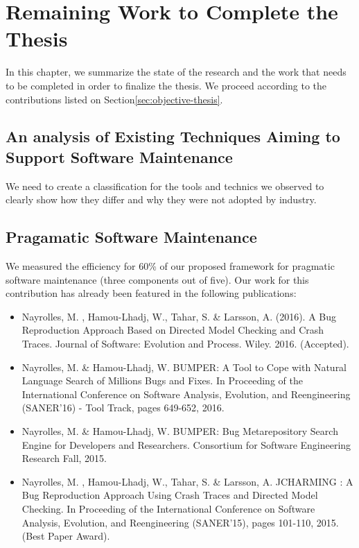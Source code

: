 
\chapter{Remaining Work to Complete the Thesis\label{chap:plan}}

In this chapter, we summarize the state of the research and the work that needs to be completed in order to finalize the thesis.
We proceed according to the contributions listed on Section\ref{sec:objective-thesis}.


\section{An analysis of Existing Techniques Aiming to Support Software Maintenance}

We need to create a classification for the tools and technics we observed to clearly show how they differ and why they were not adopted by industry.

\section{Pragamatic Software Maintenance}

We measured the efficiency for 60\% of our proposed framework for pragmatic software maintenance (three components out of five).
Our work for this contribution has already been featured in the following publications:

\begin{itemize}
	\item Nayrolles, M. , Hamou-Lhadj, W., Tahar, S. & Larsson, A. (2016). A Bug Reproduction Approach Based on Directed Model Checking and Crash Traces. Journal of Software: Evolution and Process. Wiley. 2016. (Accepted).
	\item Nayrolles, M. \& Hamou-Lhadj, W. BUMPER: A Tool to Cope with Natural Language Search of Millions Bugs and Fixes. In Proceeding of the International Conference on Software Analysis, Evolution, and Reengineering (SANER'16) - Tool Track, pages 649-652, 2016.
	\item Nayrolles, M. \& Hamou-Lhadj, W. BUMPER: Bug Metarepository Search Engine for Developers and Researchers. Consortium for Software Engineering Research Fall, 2015.
	\item Nayrolles, M. , Hamou-Lhadj, W., Tahar, S. & Larsson, A. JCHARMING : A Bug Reproduction Approach Using Crash Traces and Directed Model Checking. In Proceeding of the International Conference on Software Analysis, Evolution, and Reengineering (SANER'15), pages 101-110, 2015. (Best Paper Award).
\end{itemize}

